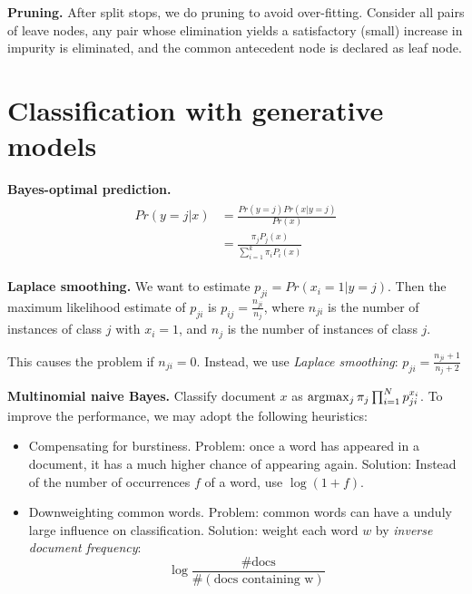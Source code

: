 \textbf{Pruning.}\hspace{0.2cm} After split stops, we do pruning to avoid over-fitting. Consider all pairs of leave nodes,
any pair whose elimination yields a satisfactory (small)
increase in impurity is eliminated, and the common
antecedent node is declared as leaf node.

\section{Classification with generative models}

\textbf{Bayes-optimal prediction.}\hspace{0.2cm}
\begin{align}
	\begin{split}
	Pr(y= j | x) &= \frac{Pr(y= j) Pr(x|y=j)}{Pr(x)} \\
		&= \frac{\pi_j P_j(x)}{\sum_{i=1}^{k} \pi_i P_i(x)}
	\end{split}
\end{align}


\textbf{Laplace smoothing.}\hspace{0.2cm}
We want to estimate $p_{ji} = Pr(x_i = 1 | y=j)$. Then the maximum likelihood estimate of $p_{ji}$ is $p_{ij} = \frac{n_{ji}}{n_j}$, where $n_{ji}$ is the number of instances of class $j$ with $x_i = 1$, and $n_j$ is the number of 
instances of class $j$. 
\begin{remark}
This causes the problem if $n_{ji} = 0$. Instead, we use \textit{Laplace smoothing}: $p_{ji} = \frac{n_{ji} + 1}{n_j + 2}$
\end{remark} 


\textbf{Multinomial naive Bayes.}\hspace{0.2cm}
Classify document $x$ as $\arg\!\max_j \pi_j \prod_{i=1}^{N} p_{ji} ^ {x_i}$.
To improve the performance, we may adopt the following heuristics:
\begin{itemize}
	\item Compensating for burstiness. Problem: once a word has appeared in a document, it has a much higher chance of appearing again.
	Solution: Instead of the number of occurrences $f$ of a word, use
	$\log(1 + f )$.
	
	\item Downweighting common words. Problem: common words can have a unduly large influence on classification. Solution: weight each word $w$ by \textit{inverse document frequency}:
	\[
		\log\frac{\# \text{docs}}{\#(\text{docs containing w})}
	\]
\end{itemize}

